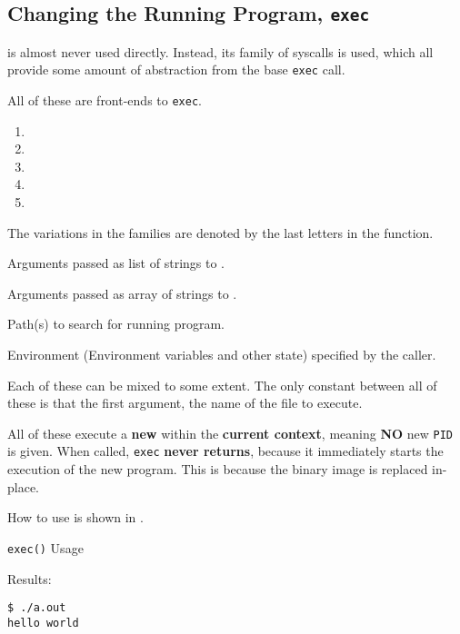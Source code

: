 \subsection{Changing the Running Program, \texttt{exec}}\label{subsec:Change_Running_Program-exec}
 is almost never used directly.
Instead, its family of syscalls is used, which all provide some amount of abstraction from the base \texttt{exec} call.

All of these are front-ends to \texttt{exec}.
\begin{enumerate}[noitemsep]
\item {}
\item {}
\item {}
\item {}
\item {}
\end{enumerate}

The variations in the families are denoted by the last letters in the function.
\begin{description}[noitemsep]
\item[\texttt{l}:] Arguments passed as list of strings to .
\item[\texttt{v}:] Arguments passed as array of strings to .
\item[\texttt{p}:] Path(s) to search for running program.
\item[\texttt{e}:] Environment (Environment variables and other state) specified by the caller.
\end{description}

Each of these can be mixed to some extent.
The only constant between all of these is that the first argument, the name of the file to execute.

All of these execute a \textbf{new } within the \textbf{current  context}, meaning \textbf{NO} new \texttt{PID} is given.
When called, \texttt{exec} \textbf{never returns}, because it immediately starts the execution of the new program.
This is because the binary image is replaced in-place.

How to use  is shown in .

\begin{listing}[h!tbp]
\caption{\texttt{exec()} Usage}
\label{lst:exec_Usage}

Results:
\begin{verbatim}
$ ./a.out
hello world
\end{verbatim}
\end{listing}


